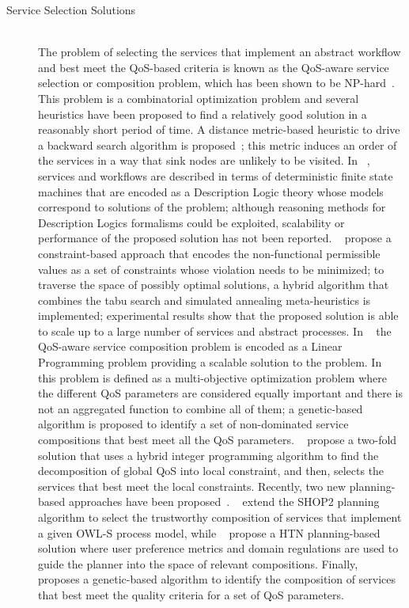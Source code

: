 \documentclass{llncs}
\begin{document}
\begin{description}
\item[Service Selection Solutions] \mbox{}\\
The problem of selecting the services that implement an abstract workflow and best meet the QoS-based criteria  is known as the QoS-aware service selection or composition problem, which has been shown to be NP-hard~\cite{Hiroshi2008}. This problem is a combinatorial optimization problem and several heuristics have been proposed to find a relatively good solution in a reasonably short period of time.  A  distance metric-based heuristic  to drive a backward search algorithm  is proposed~\cite{rahmani08}; this metric induces an order of the services in a way that sink nodes are unlikely to be visited. In ~\cite{berardi05,berardi08,berardi06}, services and workflows are described in terms of deterministic finite state machines that are encoded as a Description Logic theory whose models correspond to solutions of the problem;  although reasoning methods for Description Logics formalisms could be exploited, scalability or performance of the proposed solution has not been reported.  ~\cite{myoung08} propose a constraint-based approach that encodes the non-functional permissible values as a set of constraints whose violation needs to be minimized; to traverse the space of possibly optimal solutions, a hybrid algorithm that combines the tabu search and simulated annealing meta-heuristics is implemented; experimental results show that the proposed solution is able to scale up to a large number of services and abstract processes.  In ~\cite{cardellini07} the QoS-aware service composition problem is encoded as a Linear Programming problem providing a scalable solution to the problem.  In ~\cite{Hiroshi2008}  this problem  is defined as a multi-objective optimization problem where the different QoS parameters are considered equally important and there is not an aggregated function to combine all of them; a genetic-based algorithm is proposed to identify a set of non-dominated service compositions that best meet all the QoS parameters.  ~\cite{alrifaiR09} propose a two-fold solution that uses a hybrid integer programming algorithm to find the decomposition of global QoS into local constraint, and then,  selects the services that best meet the local constraints.   
Recently,  two new planning-based approaches have been proposed~\cite{kuterG09,sohrabiM09}.  ~\cite{kuterG09} extend the SHOP2 planning algorithm to select the trustworthy composition of services that implement a given OWL-S process model, while ~\cite{sohrabiM09}  propose a HTN planning-based solution where user preference metrics and domain regulations are used to guide the planner into the space of relevant compositions. Finally, ~\cite{lecue09} proposes a genetic-based algorithm to identify the composition of services that best meet the quality criteria for a set of QoS parameters.  


\end{description}
\end{document}
